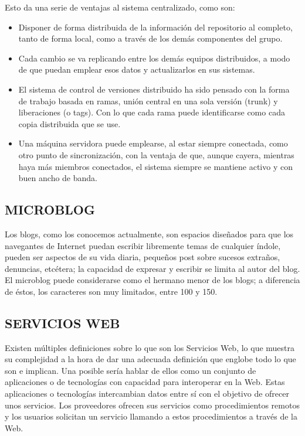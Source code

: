 \begin{itemize}
Esto da una serie de ventajas al sistema centralizado, como son:
  \begin{itemize}
    \item Disponer de forma distribuida de la información del repositorio al completo, tanto de forma local, como a través de los demás componentes del grupo.
    \item Cada cambio se va replicando entre los demás equipos distribuidos, a modo de que puedan emplear esos datos y actualizarlos en sus sistemas.
    \item El sistema de control de versiones distribuido ha sido pensado con la forma de trabajo basada en ramas, unión central en una sola versión (trunk) y liberaciones (o tags). Con lo que cada rama puede identificarse como cada copia distribuida que se use.
    \item Una máquina servidora puede emplearse, al estar siempre conectada, como otro punto de sincronización, con la ventaja de que, aunque cayera, mientras haya más miembros conectados, el sistema siempre se mantiene activo y con buen ancho de banda.
  \end{itemize}
 
\end{itemize}

\subsection{MICROBLOG}

Los blogs, como los conocemos actualmente, son espacios diseñados para que los navegantes de Internet puedan escribir libremente temas de cualquier índole, pueden ser aspectos de su vida diaria, pequeños post sobre sucesos extraños, denuncias, etcétera; la capacidad de expresar y escribir se limita al autor del blog.\\

El microblog puede considerarse como el hermano menor de los blogs; a diferencia de éstos, los caracteres son muy limitados, entre 100 y 150. 


\subsection{SERVICIOS WEB}

Existen múltiples definiciones sobre lo que son los Servicios Web, lo que muestra su complejidad a la hora de dar una adecuada definición que englobe todo lo que son e implican. Una posible sería hablar de ellos como un conjunto de aplicaciones o de tecnologías con capacidad para interoperar en la Web. Estas aplicaciones o tecnologías intercambian datos entre sí con el objetivo de ofrecer unos servicios. Los proveedores ofrecen sus servicios como procedimientos remotos y los usuarios solicitan un servicio llamando a estos procedimientos a través de la Web.\\

